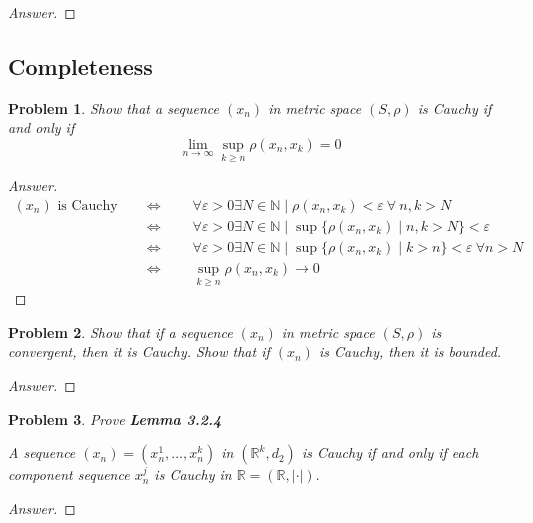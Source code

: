 \documentclass{article}
\newtheorem{problem}{Problem}[section]
\newcommand{\qiffq}{\qquad \iff \qquad}
\begin{document}
\begin{proof}[Answer]
    
\end{proof}

\subsection{Completeness}

\begin{problem} 
    Show that a sequence $\left(x_{n}\right)$ in metric space $(S, \rho)$ is Cauchy if and only if $$\lim _{n \rightarrow \infty} \sup _{k \geq n} \rho\left(x_{n}, x_{k}\right)=0$$
\end{problem}

\begin{proof}[Answer]
    \begin{align*}
        \left(x_{n}\right) \text{ is Cauchy} &\qiffq \forall \varepsilon>0 \exists N\in \mathbb{N}\mid \rho(x_n, x_k) < \varepsilon \: \forall \: n,k > N \\
        &\qiffq \forall \varepsilon>0 \exists N\in \mathbb{N}\mid \sup \{ \rho(x_n, x_k) \mid n,k > N\} < \varepsilon \\
        &\qiffq \forall \varepsilon>0 \exists N\in \mathbb{N}\mid \sup \{ \rho(x_n, x_k) \mid k > n\} < \varepsilon \: \forall n> N\\
        &\qiffq \sup_{k\geq n}\rho(x_n, x_k) \to 0
    \end{align*}
\end{proof}

\begin{problem}Show that if a sequence $\left(x_{n}\right)$ in metric space $(S, \rho)$ is convergent, then it is Cauchy. Show that if $\left(x_{n}\right)$ is Cauchy, then it is bounded.
\end{problem}

\begin{proof}[Answer]
    
\end{proof}

\begin{problem} Prove \textbf{Lemma 3.2.4}
    
    A sequence $\left(x_{n}\right)=\left(x_{n}^{1}, \ldots, x_{n}^{k}\right)$ in $\left(\mathbb{R}^{k}, d_{2}\right)$ is Cauchy if and only if each component sequence $x_{n}^{j}$ is Cauchy in $\mathbb{R}=(\mathbb{R},|\cdot|) .$
\end{problem}

\begin{proof}[Answer]
    
\end{proof}
\end{document}
